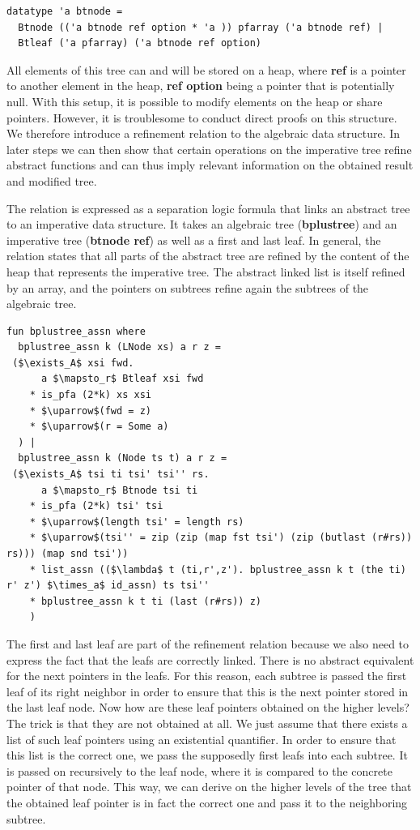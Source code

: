 \documentclass[a4paper,UKenglish,cleveref, autoref, thm-restate]{lipics-v2021}
\begin{document}
\begin{lstlisting}[mathescape=true, language=Isabelle,label=lst:btree-imp-def]
datatype 'a btnode =
  Btnode (('a btnode ref option * 'a )) pfarray ('a btnode ref) |
  Btleaf ('a pfarray) ('a btnode ref option)
\end{lstlisting}

All elements of this tree can and will be stored on a heap, where \textbf{ref} is a pointer
to another element in the heap, \textbf{ref option} being a pointer that is potentially null.
With this setup, it is possible to modify elements on the heap or share pointers.
However, it is troublesome to conduct direct proofs on this structure.
We therefore introduce a refinement relation to the algebraic data structure.
In later steps we can then show that certain operations on the imperative
tree refine abstract functions and can thus imply relevant information on the obtained result and modified tree.

The relation is expressed as a separation logic formula that links an abstract tree to an
imperative data structure.
It takes an algebraic tree (\textbf{bplustree}) and an imperative tree
(\textbf{btnode ref}) as well as a first and last leaf.
In general, the relation states that all parts of the abstract tree
are refined by the content of the heap that represents the imperative tree.
The abstract linked list is itself refined by an array,
and the pointers on subtrees refine again the subtrees of the algebraic tree.

\begin{lstlisting}[mathescape=true, language=Isabelle,label=lst:btree-relation]
fun bplustree_assn where
  bplustree_assn k (LNode xs) a r z =
 ($\exists_A$ xsi fwd.
      a $\mapsto_r$ Btleaf xsi fwd
    * is_pfa (2*k) xs xsi
    * $\uparrow$(fwd = z)
    * $\uparrow$(r = Some a)
  ) |
  bplustree_assn k (Node ts t) a r z =
 ($\exists_A$ tsi ti tsi' tsi'' rs.
      a $\mapsto_r$ Btnode tsi ti
    * is_pfa (2*k) tsi' tsi
    * $\uparrow$(length tsi' = length rs)
    * $\uparrow$(tsi'' = zip (zip (map fst tsi') (zip (butlast (r#rs)) rs))) (map snd tsi'))
    * list_assn (($\lambda$ t (ti,r',z'). bplustree_assn k t (the ti) r' z') $\times_a$ id_assn) ts tsi''
    * bplustree_assn k t ti (last (r#rs)) z)
    )
\end{lstlisting}

The first and last leaf are part of the refinement relation because
we also need to express the fact that the leafs are correctly linked.
There is no abstract equivalent for the next pointers in the leafs.
For this reason, each subtree is passed the first leaf of its right neighbor
in order to ensure that this is the next pointer stored in the last leaf node.
Now how are these leaf pointers obtained on the higher levels?
The trick is that they are not obtained at all.
We just assume that there exists a list of such leaf pointers using an existential quantifier.
In order to ensure that this list is the correct one, we pass the supposedly
first leafs into each subtree.
It is passed on recursively to the leaf node,
where it is compared to the concrete pointer of that node.
This way, we can derive on the higher levels of the tree
that the obtained leaf pointer is in fact the correct one and pass it to the
neighboring subtree.
\end{document}
